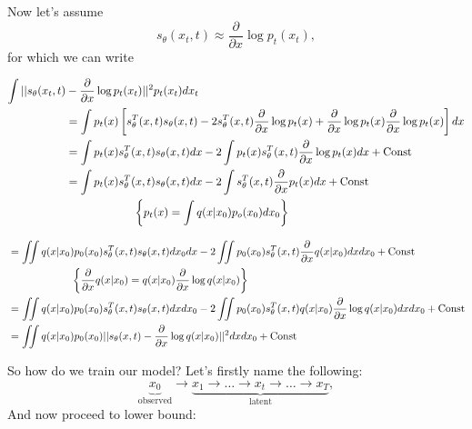 Now let's assume $$s_\theta (x_t, t) \approx \frac{\partial}{\partial x} \log p_t (x_t),$$ for which we can write 

\begin{equation*}
    \begin{aligned}
        \int || s_\theta (x_t, t) &-\frac{\partial}{\partial x} \log p_t (x_t) ||^2 p_t(x_t) dx_t \\ 
        &= \int p_t(x) \left[ s_\theta^T (x, t) s_\theta (x, t) - 2 s_\theta^T (x, t) \frac{\partial}{\partial x} \log p_t (x) + \frac{\partial}{\partial x} \log p_t (x) \frac{\partial}{\partial x} \log p_t (x) \right] dx \\ 
        &= \int p_t(x) s_\theta^T (x, t) s_\theta (x, t) dx - 2 \int p_t(x) s_\theta^T (x, t) \frac{\partial}{\partial x} \log p_t (x) dx + \operatorname{Const} \\ 
        &= \int p_t(x) s_\theta^T (x, t) s_\theta (x, t) dx - 2 \int s_\theta^T (x, t) \frac{\partial}{\partial x} p_t(x) dx + \operatorname{Const} \\ 
        &\qquad \qquad \qquad\left\{ p_t(x) = \int q(x | x_0) p_o (x_0) dx_0 \right\} \\ 
    \end{aligned}
\end{equation*}

\begin{equation*}
    \begin{aligned}
        &= \iint q(x | x_0) p_0 (x_0) s_\theta^T (x, t) s_\theta (x, t) d x_0 dx - 2 \iint p_0(x_0) s_\theta^T (x, t) \frac{\partial}{\partial x} q(x | x_0) d x d x_0 + \operatorname{Const} \\ 
        &\qquad \qquad \qquad \left\{ \frac{\partial}{\partial x} q(x | x_0) = q(x | x_0) \frac{\partial}{\partial x} \log q(x | x_0) \right\} \\ 
        &= \iint q( x | x_0) p_0 (x_0) s_\theta^T (x, t) s_\theta (x, t) d x d x_0 - 2 \iint p_0(x_0) s_\theta^T (x, t) q(x | x_0) \frac{\partial}{\partial x} \log q(x | x_0) d x d x_0 + \operatorname{Const} \\
        &= \iint q( x | x_0) p_0 (x_0) || s_\theta (x, t) - \frac{\partial}{\partial x} \log q(x | x_0) ||^2 d x d x_0 + \operatorname{Const}
    \end{aligned}
\end{equation*}

So how do we train our model? Let's firstly name the following:
\[ 
    \underbrace{x_0}_{\text{observed}} \to \underbrace{x_1 \to \ldots \to x_t \to \ldots \to x_T}_{\text{latent}},
\]
And now proceed to lower bound:

